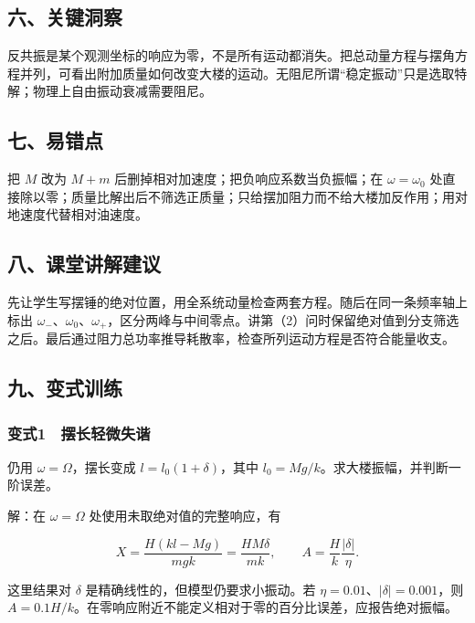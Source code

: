 \documentclass[12pt,a4paper,fontset=fandol]{ctexart}
\begin{document}
\subsection{六、关键洞察}\label{ux516dux5173ux952eux6d1eux5bdf}

反共振是某个观测坐标的响应为零，不是所有运动都消失。把总动量方程与摆角方程并列，可看出附加质量如何改变大楼的运动。无阻尼所谓``稳定振动''只是选取特解；物理上自由振动衰减需要阻尼。

\subsection{七、易错点}\label{ux4e03ux6613ux9519ux70b9}

把 \(M\) 改为 \(M+m\) 后删掉相对加速度；把负响应系数当负振幅；在
\(\omega=\omega_0\)
处直接除以零；质量比解出后不筛选正质量；只给摆加阻力而不给大楼加反作用；用对地速度代替相对油速度。

\subsection{八、课堂讲解建议}\label{ux516bux8bfeux5802ux8bb2ux89e3ux5efaux8bae}

先让学生写摆锤的绝对位置，用全系统动量检查两套方程。随后在同一条频率轴上标出
\(\omega_-\)、\(\omega_0\)、\(\omega_+\)，区分两峰与中间零点。讲第（2）问时保留绝对值到分支筛选之后。最后通过阻力总功率推导耗散率，检查所列运动方程是否符合能量收支。

\subsection{九、变式训练}\label{ux4e5dux53d8ux5f0fux8badux7ec3}

\subsubsection{变式1　摆长轻微失谐}\label{ux53d8ux5f0f1-ux6446ux957fux8f7bux5faeux5931ux8c10}

仍用 \(\omega=\Omega\)，摆长变成 \(l=l_0(1+\delta)\)，其中
\(l_0=Mg/k\)。求大楼振幅，并判断一阶误差。

解：在 \(\omega=\Omega\) 处使用未取绝对值的完整响应，有

\[X=\frac{H(kl-Mg)}{mgk}
=\frac{HM\delta}{mk},\qquad
A=\frac Hk\frac{|\delta|}{\eta}.\]

这里结果对 \(\delta\) 是精确线性的，但模型仍要求小振动。若
\(\eta=0.01\)、\(|\delta|=0.001\)，则
\(A=0.1H/k\)。在零响应附近不能定义相对于零的百分比误差，应报告绝对振幅。
\end{document}

